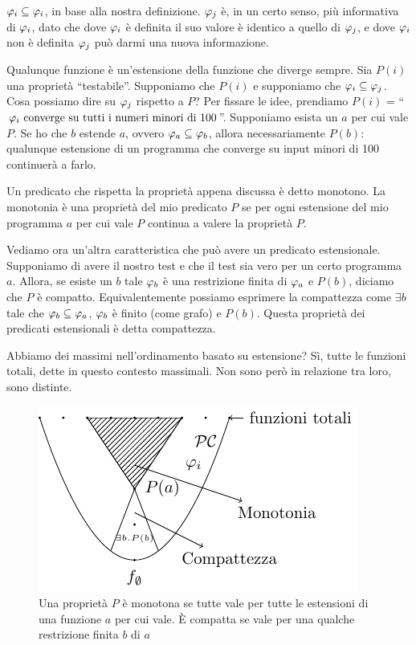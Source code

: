 $\varphi_{i} \subseteq \varphi_{i}$, in base alla nostra definizione. $\varphi_{j}$ è, in un certo senso, più
informativa di $\varphi_{i}$, dato che dove $\varphi_{i}$ è definita il suo valore è identico a quello di
$\varphi_{j}$, e dove $\varphi_{i}$ non è definita $\varphi_{j}$ può darmi una nuova informazione.

Qualunque funzione è un'estensione della funzione che diverge sempre. Sia $P(i)$ una proprietà
``testabile''. Supponiamo che $P(i)$ e supponiamo che $\varphi_{i} \subseteq \varphi_{j}$. Cosa possiamo dire su
$\varphi_{j}$ rispetto a $P$? Per fissare le idee, prendiamo $P(i)$ = ``$\varphi_{i} \text{ converge su tutti i
numeri minori di 100}$''. Supponiamo esista un $a$ per cui vale $P$. Se ho che $b$ estende $a$, ovvero
$\varphi_{a} \subseteq \varphi_{b}$, allora necessariamente $P(b)$: qualunque estensione di un programma che
converge su input minori di 100 continuerà a farlo.

Un predicato che rispetta la proprietà appena discussa è detto monotono. La monotonia è una
proprietà del mio predicato $P$ se per ogni estensione del mio programma $a$ per cui vale $P$
continua a valere la proprietà $P$. 

Vediamo ora un'altra caratteristica che può avere un predicato estensionale. Supponiamo di avere il
nostro test e che il test sia vero per un certo programma $a$. Allora, se esiste un $b$ tale $\varphi_{b}$ è
una restrizione finita di $\varphi_{a}$ e $P(b)$, diciamo che $P$ è compatto. Equivalentemente possiamo
esprimere la compattezza come $\exists b$ tale che $\varphi_{b} \subseteq \varphi_{a}$, $\varphi_{b}$ è finito (come grafo)
e $P(b)$. Questa proprietà dei predicati estensionali è detta compattezza.

Abbiamo dei massimi nell'ordinamento basato su estensione? Sì, tutte le funzioni totali, dette in
questo contesto massimali. Non sono però in relazione tra loro, sono distinte.

\begin{figure}[!h]
    \centering
    \includegraphics{./img/rice/ExtensionHierarchy.pdf}
    \caption{Una proprietà $P$ è monotona se tutte vale per tutte le estensioni di una funzione $a$
    per cui vale. È compatta se vale per una qualche restrizione finita $b$ di $a$}
\end{figure}

